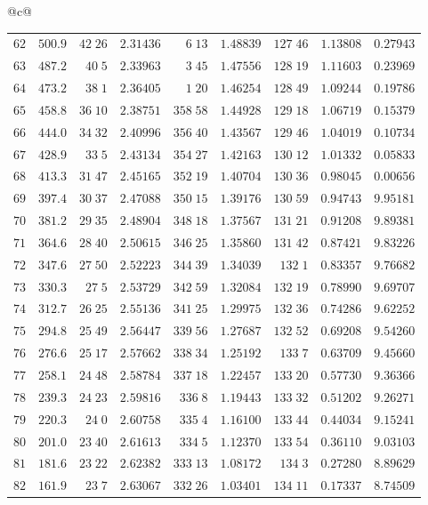 \begin{center}
{\begin{tabular}{@{}c@{}}
\begin{tabular}{r|r|r|r|r|r|r|r|r}
$62$&$500.9$&$42\;26$&$2.31436$&$6\;13$&$1.48839$&$127\;46$&$1.13808$&$0.27943$\\
$63$&$487.2$&$40\;5$&$2.33963$&$3\;45$&$1.47556$&$128\;19$&$1.11603$&$0.23969$\\
$64$&$473.2$&$38\;1$&$2.36405$&$1\;20$&$1.46254$&$128\;49$&$1.09244$&$0.19786$\\[2pt]
$65$&$458.8$&$36\;10$&$2.38751$&$358\;58$&$1.44928$&$129\;18$&$1.06719$&$0.15379$\\
$66$&$444.0$&$34\;32$&$2.40996$&$356\;40$&$1.43567$&$129\;46$&$1.04019$&$0.10734$\\
$67$&$428.9$&$33\;5$&$2.43134$&$354\;27$&$1.42163$&$130\;12$&$1.01332$&$0.05833$\\
$68$&$413.3$&$31\;47$&$2.45165$&$352\;19$&$1.40704$&$130\;36$&$0.98045$&$0.00656$\\
$69$&$397.4$&$30\;37$&$2.47088$&$350\;15$&$1.39176$&$130\;59$&$0.94743$&$9.95181$\\[2pt]
$70$&$381.2$&$29\;35$&$2.48904$&$348\;18$&$1.37567$&$131\;21$&$0.91208$&$9.89381$\\
$71$&$364.6$&$28\;40$&$2.50615$&$346\;25$&$1.35860$&$131\;42$&$0.87421$&$9.83226$\\
$72$&$347.6$&$27\;50$&$2.52223$&$344\;39$&$1.34039$&$132\;1$&$0.83357$&$9.76682$\\
$73$&$330.3$&$27\;5$&$2.53729$&$342\;59$&$1.32084$&$132\;19$&$0.78990$&$9.69707$\\
$74$&$312.7$&$26\;25$&$2.55136$&$341\;25$&$1.29975$&$132\;36$&$0.74286$&$9.62252$\\[2pt]
$75$&$294.8$&$25\;49$&$2.56447$&$339\;56$&$1.27687$&$132\;52$&$0.69208$&$9.54260$\\
$76$&$276.6$&$25\;17$&$2.57662$&$338\;34$&$1.25192$&$133\;7$&$0.63709$&$9.45660$\\
$77$&$258.1$&$24\;48$&$2.58784$&$337\;18$&$1.22457$&$133\;20$&$0.57730$&$9.36366$\\
$78$&$239.3$&$24\;23$&$2.59816$&$336\;8$&$1.19443$&$133\;32$&$0.51202$&$9.26271$\\
$79$&$220.3$&$24\;0$&$2.60758$&$335\;4$&$1.16100$&$133\;44$&$0.44034$&$9.15241$\\[2pt]
$80$&$201.0$&$23\;40$&$2.61613$&$334\;5$&$1.12370$&$133\;54$&$0.36110$&$9.03103$\\
$81$&$181.6$&$23\;22$&$2.62382$&$333\;13$&$1.08172$&$134\;3$&$0.27280$&$8.89629$\\
$82$&$161.9$&$23\;7$&$2.63067$&$332\;26$&$1.03401$&$134\;11$&$0.17337$&$8.74509$\\

\end{tabular}
\end{tabular}}
\end{center}
